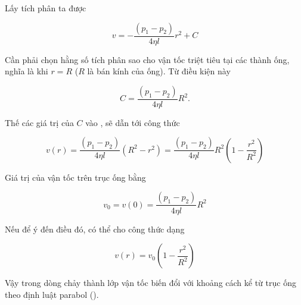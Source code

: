 Lấy tích phân ta được

\begin{equation}\label{eq:9_17}
	v = -\frac{(p_1 - p_2)}{4\eta l}r^2 + C
\end{equation}
\noindent


Cần phải chọn hằng số tích phân sao cho vận tốc triệt tiêu tại các thành ống, nghĩa là khi $r=R$ ($R$ là bán kính của ống). Từ điều kiện này

\begin{equation*}
	C = \frac{(p_1 - p_2)}{4\eta l}R^2.
\end{equation*}
\noindent

Thế các giá trị của $C$ vào , sẽ dẫn tới công thức

\begin{equation}\label{eq:9_18}
	v(r) = \frac{(p_1 - p_2)}{4\eta l}\left(R^2 - r^2\right) = \frac{(p_1 - p_2)}{4\eta l}R^2\left(1 - \frac{r^2}{R^2}\right)
\end{equation}
\noindent

Giá trị của vận tốc trên trục ống bằng

\begin{equation}\label{eq:9_19}
	v_0 = v(0) = \frac{(p_1 - p_2)}{4\eta l}R^2
\end{equation}
\noindent

Nếu để ý đến điều đó, có thể cho công thức  dạng

\begin{equation}\label{eq:9_20}
	v(r) = v_0 \left(1 - \frac{r^2}{R^2}\right)
\end{equation}
\noindent


Vậy trong dòng chảy thành lớp vận tốc biến đổi với khoảng cách kể từ trục ống theo định luật parabol ().


